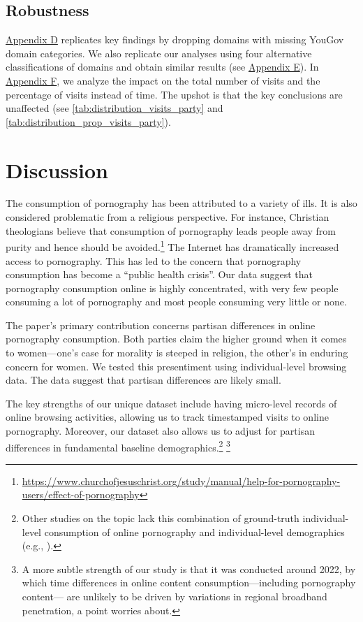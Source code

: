 \documentclass[12pt,twoside]{article}
\begin{document}
\subsection{Robustness}\label{sec:robustness}
\hyperref[sm:smD]{Appendix D} replicates key findings by dropping domains with missing YouGov domain categories. We also replicate our analyses using four alternative classifications of domains and obtain similar results (see \hyperref[sm:smE]{Appendix E}). In \hyperref[sm:smF]{Appendix F}, we analyze the impact on the total number of visits and the percentage of visits instead of time. The upshot is that the key conclusions are unaffected (see \cref{tab:distribution_visits_party} and \cref{tab:distribution_prop_visits_party}). 

\section{Discussion}
\label{sec:discussion}
The consumption of pornography has been attributed to a variety of ills. It is also considered problematic from a religious perspective. For instance, Christian theologians believe that consumption of pornography leads people away from purity and hence should be avoided.\footnote{\url{https://www.churchofjesuschrist.org/study/manual/help-for-pornography-users/effect-of-pornography}} The Internet has dramatically increased access to pornography. This has led to the concern that pornography consumption has become a ``public health crisis''. Our data suggest that pornography consumption online is highly concentrated, with very few people consuming a lot of pornography and most people consuming very little or none.

The paper's primary contribution concerns partisan differences in online pornography consumption. Both parties claim the higher ground when it comes to women—one's case for morality is steeped in religion, the other's in enduring concern for women. We tested this presentiment using individual-level browsing data. The data suggest that partisan differences are likely small.

The key strengths of our unique dataset include having micro-level records of online browsing activities, allowing us to track timestamped visits to online pornography. Moreover, our dataset also allows us to adjust for partisan differences in fundamental baseline demographics.\footnote{Other studies on the topic lack this combination of ground-truth individual-level consumption of online pornography and individual-level demographics (e.g., \cite{Peek1982-ua, Woodrum1992-vk, Markey2011-xo, Perry2020-cp, Ybarra2005-id, Perry2018-cw, Price2016-sm, webporn, Wright2013-gl}).} \footnote{A more subtle strength of our study is that it was conducted around 2022, by which time differences in online content consumption---including pornography content--- are unlikely to be driven by variations in regional broadband penetration, a point \cite{edelman2009markets} worries about.}
\end{document}
